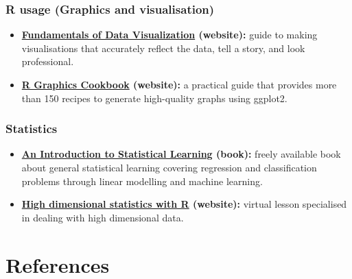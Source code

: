 \documentclass[
]{book}
\providecommand{\tightlist}{%
  \setlength{\itemsep}{0pt}\setlength{\parskip}{0pt}}
\begin{document}
\hypertarget{r-usage-graphics-and-visualisation}{%
\subsection*{R usage (Graphics and visualisation)}\label{r-usage-graphics-and-visualisation}}

\begin{itemize}
\tightlist
\item
  \textbf{\href{https://clauswilke.com/dataviz/}{Fundamentals of Data Visualization} (website):} guide to making visualisations that accurately reflect the data, tell a story, and look professional.
\item
  \textbf{\href{https://r-graphics.org/index.html}{R Graphics Cookbook} (website):} a practical guide that provides more than 150 recipes to generate high-quality graphs using ggplot2.
\end{itemize}

\hypertarget{statistics}{%
\subsection*{Statistics}\label{statistics}}

\begin{itemize}
\tightlist
\item
  \textbf{\href{https://www.statlearning.com/}{An Introduction to Statistical Learning} (book):} freely available book about general statistical learning covering regression and classification problems through linear modelling and machine learning.
\item
  \textbf{\href{https://carpentries-incubator.github.io/high-dimensional-stats-r/}{High dimensional statistics with R} (website):} virtual lesson specialised in dealing with high dimensional data.
\end{itemize}

\hypertarget{references}{%
\chapter{References}\label{references}}

  
\end{document}
